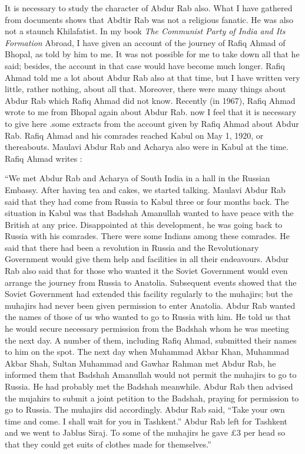 It is necessary to study the character of Abdur Rab also. What I have gathered from documents shows that Abdtir Rab was not a religious fanatic. He was also not a staunch Khilafatist. In my book \textit{The Communist Party of India and Its Formation} Abroad, I have given an account of the journey of Rafiq Ahmad of Bhopal, as told by him to me. It was not possible for me to take down all that he said; besides, the account in that case would have become much longer. Rafiq Ahmad told me a lot about Abdur Rab also at that time, but I have written very little, rather nothing, about all that. Moreover, there were many things about Abdur Rab which Rafiq Ahmad did not know. Recently (in 1967), Rafiq Ahmad wrote to me from Bhopal again about Abdur Rab. now I feel that it is necessary to give here .some extracts from the account given 
by Rafiq Ahmad about Abdur Rab. Rafiq Ahmad and his comrades reached Kabul on May 1, 1920, or thereabouts. Maulavi Abdur Rab and Acharya also were in Kabul at the time. Rafiq Ahmad writes : 

“We met Abdur Rab and Acharya of South India in a hall in the Russian Embassy. After having tea and cakes, we started talking. Maulavi Abdur Rab said that they had come from Russia to Kabul three or four months back. The situation in Kabul was that Badshah Amanullah wanted to have peace with the British at any price. Disappointed at this development, he was going back to Russia with his comrades. There were some Indians among these comrades. He said that there had been a revolution in Russia and the Revolutionary Government would give them help and facilities in all their endeavours. Abdur Rab also said that for those who wanted it the Soviet Government would even arrange the journey from Russia to Anatolia. Subsequent events showed that the Soviet Government had extended this facility regularly to the muhajirs; but the muhajirs had never been given permission to enter Anatolia. Abdur Rab wanted the names of those of us who wanted to go to Russia with him. He told us that 
he would secure necessary permission from the Badshah whom he was meeting the next day. A number of them, including Rafiq Ahmad, submitted their names to him on the spot. The next day when Muhammad Akbar Khan, Muhammad Akbar Shah, Sultan Muhammad and Gawhar Rahman met Abdur Rab, he informed them that Badshah Amanullah would not permit the muhajirs to go to Russia. He had probably met the Badshah meanwhile. Abdur Rab then advised the mujahirs to submit a joint petition to the Badshah, praying for permission to go to Russia. The muhajirs did accordingly. Abdur Rab said, “Take your own time and come. I shall wait for you in Tashkent.” Abdur Rab left for Tashkent and we went to Jablus Siraj. To some of the muhajirs he gave £3 per head so that they could get suits of clothes made for themselves.” 


